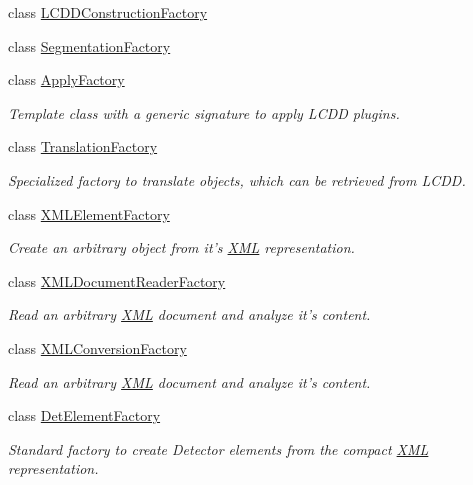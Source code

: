 \begin{DoxyCompactItemize}
class \hyperlink{class_d_d4hep_1_1_l_c_d_d_construction_factory}{LCDDConstructionFactory}
\item 
class \hyperlink{class_d_d4hep_1_1_segmentation_factory}{SegmentationFactory}
\item 
class \hyperlink{class_d_d4hep_1_1_apply_factory}{ApplyFactory}
\begin{DoxyCompactList}\small\item\em Template class with a generic signature to apply LCDD plugins. \item\end{DoxyCompactList}\item 
class \hyperlink{class_d_d4hep_1_1_translation_factory}{TranslationFactory}
\begin{DoxyCompactList}\small\item\em Specialized factory to translate objects, which can be retrieved from LCDD. \item\end{DoxyCompactList}\item 
class \hyperlink{class_d_d4hep_1_1_x_m_l_element_factory}{XMLElementFactory}
\begin{DoxyCompactList}\small\item\em Create an arbitrary object from it's \hyperlink{namespace_d_d4hep_1_1_x_m_l}{XML} representation. \item\end{DoxyCompactList}\item 
class \hyperlink{class_d_d4hep_1_1_x_m_l_document_reader_factory}{XMLDocumentReaderFactory}
\begin{DoxyCompactList}\small\item\em Read an arbitrary \hyperlink{namespace_d_d4hep_1_1_x_m_l}{XML} document and analyze it's content. \item\end{DoxyCompactList}\item 
class \hyperlink{class_d_d4hep_1_1_x_m_l_conversion_factory}{XMLConversionFactory}
\begin{DoxyCompactList}\small\item\em Read an arbitrary \hyperlink{namespace_d_d4hep_1_1_x_m_l}{XML} document and analyze it's content. \item\end{DoxyCompactList}\item 
class \hyperlink{class_d_d4hep_1_1_det_element_factory}{DetElementFactory}
\begin{DoxyCompactList}\small\item\em Standard factory to create Detector elements from the compact \hyperlink{namespace_d_d4hep_1_1_x_m_l}{XML} representation. \item\end{DoxyCompactList}\item 

\end{DoxyCompactItemize}
